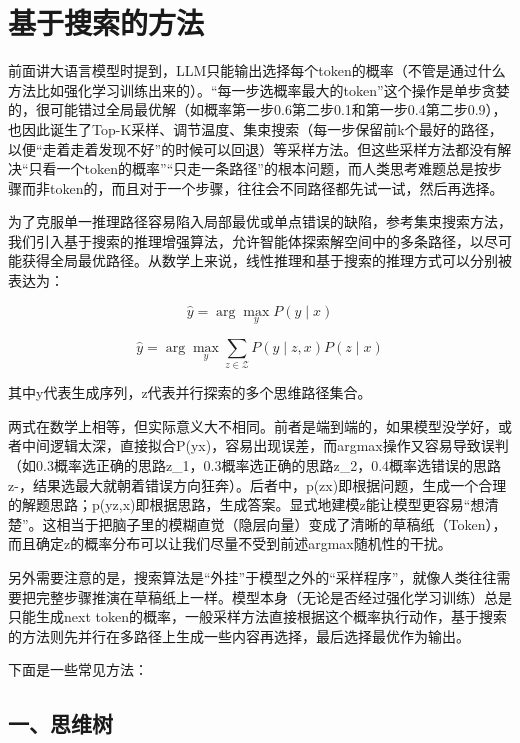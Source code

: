 \setcounter{section}{1}

\hypertarget{ux57faux4e8eux641cux7d22ux7684ux65b9ux6cd5}{%
\section{基于搜索的方法}\label{ux57faux4e8eux641cux7d22ux7684ux65b9ux6cd5}}

前面讲大语言模型时提到，LLM只能输出选择每个token的概率（不管是通过什么方法比如强化学习训练出来的）。``每一步选概率最大的token''这个操作是单步贪婪的，很可能错过全局最优解（如概率第一步0.6第二步0.1和第一步0.4第二步0.9），也因此诞生了Top-K采样、调节温度、集束搜索（每一步保留前k个最好的路径，以便``走着走着发现不好''的时候可以回退）等采样方法。但这些采样方法都没有解决``只看一个token的概率''``只走一条路径''的根本问题，而人类思考难题总是按步骤而非token的，而且对于一个步骤，往往会不同路径都先试一试，然后再选择。

为了克服单一推理路径容易陷入局部最优或单点错误的缺陷，参考集束搜索方法，我们引入基于搜索的推理增强算法，允许智能体探索解空间中的多条路径，以尽可能获得全局最优路径。从数学上来说，线性推理和基于搜索的推理方式可以分别被表达为：

\[
\hat{y}=\arg\max_y P(y\mid x)
\]

\[
\hat{y}=\arg\max_y\sum_{z\in\mathcal{Z}}P(y\mid z,x)P(z\mid x)
\]

其中y代表生成序列，z代表并行探索的多个思维路径集合。

两式在数学上相等，但实际意义大不相同。前者是端到端的，如果模型没学好，或者中间逻辑太深，直接拟合P(y\textbar x)，容易出现误差，而argmax操作又容易导致误判（如0.3概率选正确的思路z\_1，0.3概率选正确的思路z\_2，0.4概率选错误的思路z-，结果选最大就朝着错误方向狂奔）。后者中，p(z\textbar x)即根据问题，生成一个合理的解题思路；p(y\textbar z,x)即根据思路，生成答案。显式地建模z能让模型更容易``想清楚''。这相当于把脑子里的模糊直觉（隐层向量）变成了清晰的草稿纸（Token），而且确定z的概率分布可以让我们尽量不受到前述argmax随机性的干扰。

另外需要注意的是，搜索算法是``外挂''于模型之外的``采样程序''，就像人类往往需要把完整步骤推演在草稿纸上一样。模型本身（无论是否经过强化学习训练）总是只能生成next token的概率，一般采样方法直接根据这个概率执行动作，基于搜索的方法则先并行在多路径上生成一些内容再选择，最后选择最优作为输出。

下面是一些常见方法：

\hypertarget{ux4e00ux601dux7ef4ux6811}{%
\subsection{一、思维树}\label{ux4e00ux601dux7ef4ux6811}}

